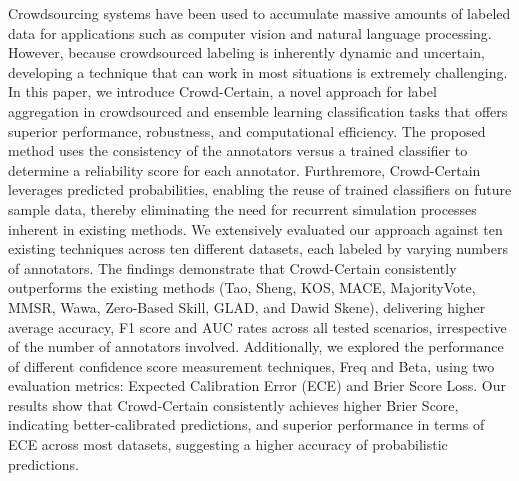 Crowdsourcing systems have been used to accumulate massive amounts of labeled data for applications such as computer vision and natural language processing. However, because crowdsourced labeling is inherently dynamic and uncertain, developing a technique that can work in most situations is extremely challenging. In this paper, we introduce Crowd-Certain, a novel approach for label aggregation in crowdsourced and ensemble learning classification tasks that offers superior performance, robustness, and computational efficiency. The proposed method uses the consistency of the annotators versus a trained classifier to determine a reliability score for each annotator. Furthremore, Crowd-Certain leverages predicted probabilities, enabling the reuse of trained classifiers on future sample data, thereby eliminating the need for recurrent simulation processes inherent in existing methods. We extensively evaluated our approach against ten existing techniques across ten different datasets, each labeled by varying numbers of annotators. The findings demonstrate that Crowd-Certain consistently outperforms the existing methods (Tao, Sheng, KOS, MACE, MajorityVote, MMSR, Wawa, Zero-Based Skill, GLAD, and Dawid Skene), delivering higher average accuracy, F1 score and AUC rates across all tested scenarios, irrespective of the number of annotators involved. Additionally, we explored the performance of different confidence score measurement techniques, Freq and Beta, using two evaluation metrics: Expected Calibration Error (ECE) and Brier Score Loss. Our results show that Crowd-Certain consistently achieves higher Brier Score, indicating better-calibrated predictions, and superior performance in terms of ECE across most datasets, suggesting a higher accuracy of probabilistic predictions.

